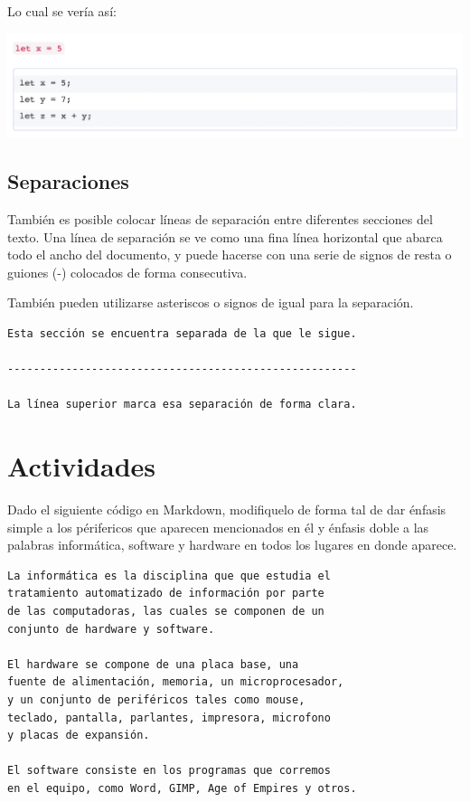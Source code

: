 Lo cual se vería así:

\includegraphics[scale=0.63]{apendices/markdown/imagenes/md_codigo.png}

\subsection*{Separaciones}

También es posible colocar líneas de separación entre diferentes secciones del
texto. Una línea de separación se ve como una fina línea horizontal que abarca
todo el ancho del documento, y puede hacerse con una serie de signos de resta o
guiones (-) colocados de forma consecutiva.

También pueden utilizarse asteriscos o signos de igual para la separación.

\begin{lstlisting}[language=Markdown]
Esta sección se encuentra separada de la que le sigue.

------------------------------------------------------

La línea superior marca esa separación de forma clara.
\end{lstlisting}


\section{Actividades}

\begin{exercise}
Dado el siguiente código en Markdown, modifiquelo de forma tal de dar énfasis
simple a los périfericos que aparecen mencionados en él y énfasis doble a las
palabras informática, software y hardware en todos los lugares en donde aparece.

\begin{minipage}{0.92\textwidth}
    \begin{lstlisting}[language=Markdown]
La informática es la disciplina que que estudia el
tratamiento automatizado de información por parte
de las computadoras, las cuales se componen de un
conjunto de hardware y software.

El hardware se compone de una placa base, una
fuente de alimentación, memoria, un microprocesador,
y un conjunto de periféricos tales como mouse,
teclado, pantalla, parlantes, impresora, microfono
y placas de expansión.

El software consiste en los programas que corremos
en el equipo, como Word, GIMP, Age of Empires y otros.
    \end{lstlisting}
\end{minipage}
\end{exercise}

